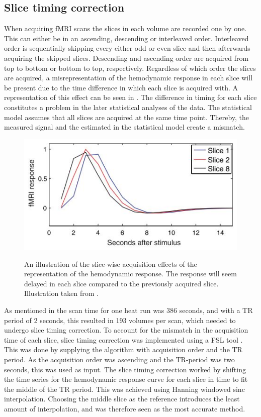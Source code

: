 \subsection{Slice timing correction}

When acquiring fMRI scans the slices in each volume are recorded one by one. This can either be in an ascending, descending or interleaved order. Interleaved order is sequentially skipping every either odd or even slice and then afterwards acquiring the skipped slices. Descending and ascending order are acquired from top to bottom or bottom to top, respectively. Regardless of which order the slices are acquired, a misrepresentation of the hemodynamic response in each slice will be present due to the time difference in which each slice is acquired with. A representation of this effect can be seen in . The difference in timing for each slice constitutes a problem in the later statistical analyses of the data. The statistical model assumes that all slices are acquired at the same time point. Thereby, the measured signal and the estimated in the statistical model create a mismatch. \cite{Poldrack2011} \\

\begin{figure}[H] 
	{\includegraphics[width=.65\textwidth]{figures/aBackground/response}}  
	\caption{An illustration of the slice-wise acquisition effects of the representation of the hemodynamic response. The response will seem delayed in each slice compared to the previously acquired slice. Illustration taken from \cite{Poldrack2011}.}
	\label{fig:meth:slice}
\end{figure}

As mentioned in  the scan time for one heat run was 386 seconds, and with a TR period of 2 seconds, this resulted in 193 volumes per scan, which needed to undergo slice timing correction. To account for the mismatch in the acquisition time of each slice, slice timing correction was implemented using a FSL tool \cite{FMRIB2018}. This was done by supplying the algorithm with acquisition order and the TR period. As the acquisition order was ascending and the TR-period was two seconds, this was used as input. The slice timing correction worked by shifting the time series for the hemodynamic response curve for each slice in time to fit the middle of the TR period. This was achieved using Hanning windowed sinc interpolation. Choosing the middle slice as the reference introduces the least amount of interpolation, and was therefore seen as the most accurate method. \cite{Poldrack2011} 

